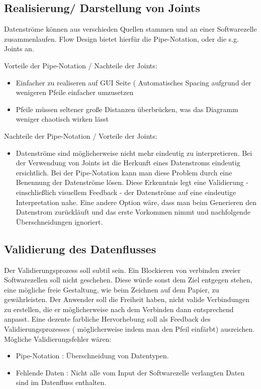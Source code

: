 \documentclass[11pt]{article}
\begin{document}
\subsection{Realisierung/ Darstellung von Joints}
\label{sec:orgheadline25}
Datenströme können aus verschieden Quellen stammen und an einer Softwarezelle
zusammenlaufen. Flow Design bietet hierfür die Pipe-Notation, oder die s.g. Joints
an. 

Vorteile der Pipe-Notation / Nachteile der Joints:

\begin{itemize}
\item Einfacher zu realiseren auf GUI Seite ( Automatisches Spacing aufgrund der
wenigeren Pfeile einfacher umzusetzen
\item Pfeile müssen seltener große Distanzen überbrücken, was das Diagramm weniger
chaotisch wirken lässt
\end{itemize}

Nachteile der Pipe-Notation / Vorteile der Joints:

\begin{itemize}
\item Datenströme sind möglicherweise nicht mehr eindeutig zu interpretieren. Bei
der Verwendung von Joints ist die Herkunft eines Datenstroms eindeutig
ersichtlich. Bei der Pipe-Notation kann man diese Problem durch eine Benennung
der Datenströme lösen. Diese Erkenntnis legt eine Validierung - einschließlich
visuellem Feedback - der Datenströme auf eine eindeutige Interpretation nahe.
Eine andere Option wäre, dass man beim Generieren den Datenstrom zurückläuft
und das erste Vorkommen nimmt und nachfolgende Überschneidungen ignoriert.
\end{itemize}


\subsection{Validierung des Datenflusses}
\label{sec:orgheadline26}
Der Validierungsprozess soll subtil sein. Ein Blockieren von verbinden zweier
Softwarezellen soll nicht geschehen. Diese würde sonst dem Ziel entgegen stehen, 
eine mögliche freie Gestaltung, wie beim Zeichnen auf dem Papier, zu
gewährleisten. Der Anwender soll die Freiheit haben, nicht valide Verbindungen
zu erstellen, die er möglicherweise nach dem Verbinden dann entsprechend
anpasst. Eine dezente farbliche Hervorhebung soll als Feedback des
Validierungsprozesses ( möglicherweise indem man den Pfeil einfärbt) ausreichen. Mögliche Validierungsfehler wären:
\begin{itemize}
\item Pipe-Notation : Überschneidung von Datentypen.
\item Fehlende Daten : Nicht alle vom Input der Softwarezelle verlangten Daten
sind im Datenfluss enthalten.
\end{itemize}
\end{document}
